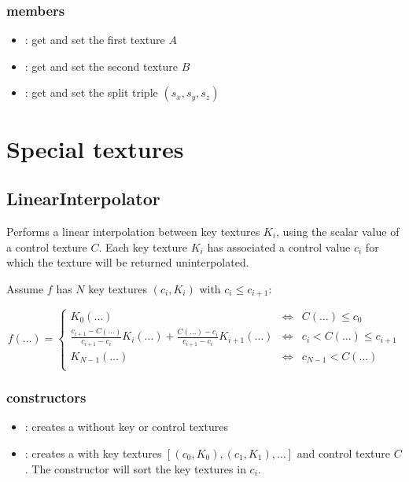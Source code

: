 \subsubsection*{members}
\begin{itemize}
	\item {}:
		get and set the first texture $A$
	\item {}:
		get and set the second texture $B$
	\item {}:
		get and set the split triple $\left(s_x, s_y, s_z\right)$
\end{itemize}





\section{Special textures} %

\subsection{LinearInterpolator}

Performs a linear interpolation between key textures $K_i$, using the scalar value of a control texture $C$.  Each key texture $K_i$ has associated a control value $c_i$ for which the texture will be returned uninterpolated.

Assume $f$ has $N$ key textures $\left(c_i, K_i\right)$ with $c_i \leq c_{i+1}$:

\begin{equation}
	f\left(\ldots\right) = \left\{
		\begin{array}{lcl}
			K_0\left(\ldots\right) & \Leftrightarrow & C\left(\ldots\right) \leq c_0 \\
			\frac{c_{i+1}-C\left(\ldots\right)}{c_{i+1}-c_i} K_i\left(\ldots\right) +
			\frac{C\left(\ldots\right)-c_i}{c_{i+1}-c_i} K_{i+1}\left(\ldots\right)
			 & \Leftrightarrow & c_i < C\left(\ldots\right) \leq c_{i+1} \\
			K_{N-1}\left(\ldots\right) & \Leftrightarrow & c_{N-1} < C\left(\ldots\right) \\
		\end{array}
	\right.
\end{equation}


\subsubsection*{constructors}
\begin{itemize}
	\item {}:
		creates a  without key or control textures
	\item {}:
		creates a  with key textures $\left[\left(c_0, K_0\right), \left(c_1, K_1\right), \ldots\right]$ and control texture $C$.  The constructor will sort the key textures in $c_i$.
\end{itemize}


